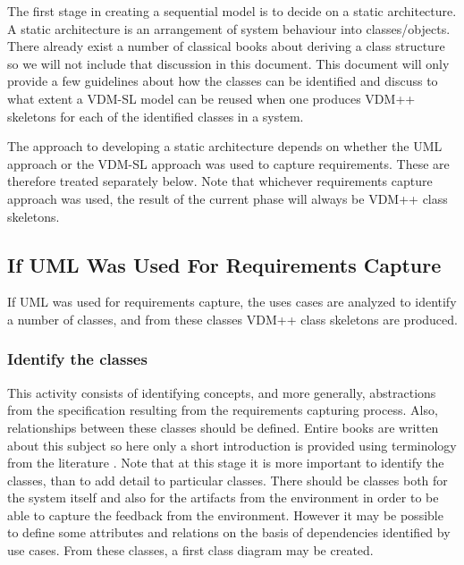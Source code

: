 \documentclass{overturerepchap}
\begin{document}
The first stage in creating a sequential model is to decide on a
static architecture. A static architecture is an arrangement of system
behaviour into classes/objects. There already exist a number of
classical books about deriving a class structure
\cite{Rumbaugh&91,Meyer88,Booch&97,Douglass99} so we will not include that
discussion in this document. This document will only provide a few
guidelines about how the classes can be identified and discuss to what
extent a VDM-SL model can be reused when one produces VDM++ skeletons
for each of the identified classes in a system.

The approach to developing a static architecture depends on whether
the UML approach or the VDM-SL approach was used to capture
requirements. These are therefore treated separately below. Note
that whichever requirements capture approach was used, the result of
the current phase will always be VDM++ class skeletons.

\subsection{If UML Was Used For Requirements Capture}\label{subsec:UMLreq}

If UML was used for requirements capture, the uses cases are analyzed
to identify a number of classes, and from these classes VDM++ class
skeletons are produced.

\subsubsection{Identify the classes}

This activity consists of identifying concepts, and more generally,
abstractions from the specification resulting from the requirements
capturing process. Also, relationships between these classes should be
defined. Entire books are written about this subject so here only a
short introduction is provided using terminology from the literature
\cite{Kruchten00}. Note that at this stage it is more important to identify the
classes, than to add detail to particular classes. There should be
classes both for the system itself and also for the artifacts from the
environment in order to be able to capture the feedback from the
environment. However it may be possible to define some attributes and
relations on the basis of dependencies identified by use cases. From
these classes, a first class diagram may be created.
\end{document}
